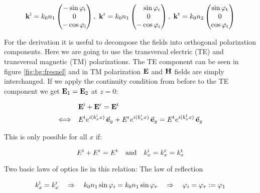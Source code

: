 \begin{equation} \label{eq:bg:k}
    \vb k^{\mathrm{i}} = k_0 n_1
    \begin{pmatrix}
        -\sin \varphi_{\mathrm{i}}\\ 0\\ -\cos \varphi_{\mathrm{i}}
    \end{pmatrix}
    , \
    \vb k^{\mathrm{r}} = k_0 n_1
    \begin{pmatrix}
        \phantom{-} \sin \varphi_{\mathrm{r}} \\ 0\\ -\cos \varphi_{\mathrm{r}}
    \end{pmatrix}
    , \
    \vb k^{\mathrm{t}} = k_0 n_2
    \begin{pmatrix}
        \sin \varphi_{\mathrm{t}}\\ 0\\ \cos \varphi_{\mathrm{t}}
    \end{pmatrix}
\end{equation} 

For the derivation it is useful to decompose the fields into orthogonal polarization components. Here we are going to use the transversal electric (TE) and transversal magnetic (TM) polarizations. The TE component can be seen in figure \ref{fig:bg:fresnel} and in TM polarization $\vb E$ and $\vb H$ fields are simply interchanged.
If we apply the continuity condition from before to the TE component we get $\vb E_1 = \vb E_2$ at $z = 0$:

\begin{equation}
\begin{aligned}
    &\vb E^{\mathrm{i}} + \vb E^{\mathrm{r}} = \vb E^{\mathrm{t}} \\
    \Longleftrightarrow \quad
    &E^{\mathrm{i}} e^{i(k^{\mathrm{i}}_x x)} \, \va e_y +
    E^{\mathrm{r}} e^{i(k^{\mathrm{r}}_x x)} \, \va e_y = 
    E^{\mathrm{t}} e^{i(k^{\mathrm{t}}_x x)} \, \va e_y
\end{aligned}
\end{equation}

This is only possible for all $x$ if:

\begin{equation} \label{eq:bg:x}
    E^\s{i} + E^\s{r} = E^\s{t} \qq{and}
    k^\s{i}_x = k^\s{r}_x = k^\s{t}_x
\end{equation}

Two basic laws of optics lie in this relation: The law of reflection

\begin{equation}
    k^{\mathrm{i}}_x = k^{\mathrm{r}}_x
    \quad \Rightarrow \quad
    k_0 n_1 \sin \varphi_i =  k_0 n_1 \sin \varphi_r
    \quad \Rightarrow \quad
    \varphi_i = \varphi_r := \varphi_1
\end{equation}

